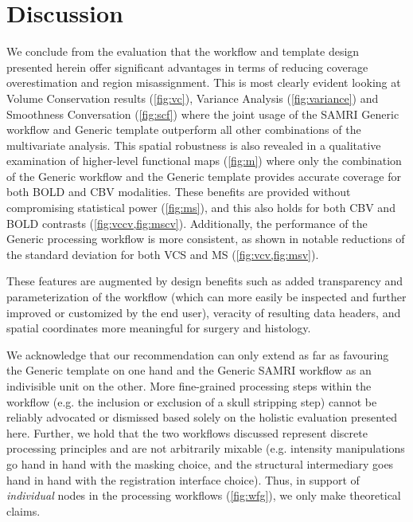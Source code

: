 \section{Discussion}

We conclude from the evaluation that the workflow and template design presented herein offer significant advantages in terms of reducing coverage overestimation and region misassignment.
This is most clearly evident looking at Volume Conservation results (\cref{fig:vc}), Variance Analysis (\cref{fig:variance}) and Smoothness Conversation (\cref{fig:scf}) where the joint usage of the SAMRI Generic workflow and Generic template outperform all other combinations of the multivariate analysis.
This spatial robustness is also revealed in a qualitative examination of higher-level functional maps (\cref{fig:m}) where only the combination of the Generic workflow and the Generic template provides accurate coverage for both BOLD and CBV modalities.
These benefits are provided without compromising statistical power (\cref{fig:ms}), and this also holds for both CBV and BOLD contrasts (\cref{fig:vccv,fig:mscv}).
Additionally, the performance of the Generic processing workflow is more consistent, as shown in notable reductions of the standard deviation for both VCS and MS (\cref{fig:vcv,fig:msv}).

These features are augmented by design benefits such as added transparency and parameterization of the workflow (which can more easily be inspected and further improved or customized by the end user), veracity of resulting data headers, and spatial coordinates more meaningful for surgery and histology.
\begin{comment}
instead of added transp. and parametrization, I would just write: ... by implementing a fully transparent and parametrized end-to-end python workflow to emphasize more
\end{comment}

We acknowledge that our recommendation can only extend as far as favouring the Generic template on one hand and the Generic SAMRI workflow as an indivisible unit on the other.
More fine-grained processing steps within the workflow (e.g. the inclusion or exclusion of a skull stripping step) cannot be reliably advocated or dismissed based solely on the holistic evaluation presented here.
Further, we hold that the two workflows discussed represent discrete processing principles and are not arbitrarily mixable (e.g. intensity manipulations go hand in hand with the masking choice, and the structural intermediary goes hand in hand with the registration interface choice).
Thus, in support of \textit{individual} nodes in the processing workflows (\cref{fig:wfg}), we only make theoretical claims.

